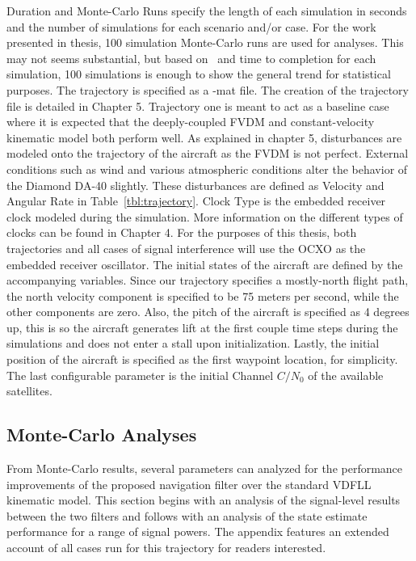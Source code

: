 Duration and Monte-Carlo Runs specify the length of each simulation in seconds and the number of simulations for each scenario and/or case. For the work presented in thesis, 100 simulation Monte-Carlo runs are used for analyses. This may not seems substantial, but based on~\cite{khaghaniAssessmentVDMbasedAutonomous2018,khaghaniAutonomousVehicleDynamic2016,mwenegohaModelbasedTightlyCoupled2020} and time to completion for each simulation, 100 simulations is enough to show the general trend for statistical purposes. The trajectory is specified as a -mat file. The creation of the trajectory file is detailed in Chapter 5. Trajectory one is meant to act as a baseline case where it is expected that the deeply-coupled FVDM and constant-velocity kinematic model both perform well.  As explained in chapter 5, disturbances are modeled onto the trajectory of the aircraft as the FVDM is not perfect. External conditions such as wind and various atmospheric conditions alter the behavior of the Diamond DA-40 slightly. These disturbances are defined as Velocity and Angular Rate in Table~\ref{tbl:trajectory}. Clock Type is the embedded receiver clock modeled during the simulation. More information on the different types of clocks can be found in Chapter 4. For the purposes of this thesis, both trajectories and all cases of signal interference will use the OCXO as the embedded receiver oscillator. The initial states of the aircraft are defined by the accompanying variables. Since our trajectory specifies a mostly-north flight path, the north velocity component is specified to be 75 meters per second, while the other components are zero. Also, the pitch of the aircraft is specified as 4 degrees up, this is so the aircraft generates lift at the first couple time steps during the simulations and does not enter a stall upon initialization. Lastly, the initial position of the aircraft is specified as the first waypoint location, for simplicity. The last configurable parameter is the initial Channel \(C/N_0\) of the available satellites.


\subsection{\textbf{Monte-Carlo Analyses}}
From Monte-Carlo results, several parameters can analyzed for the performance improvements of the proposed navigation filter over the standard VDFLL kinematic model. This section begins with an analysis of the signal-level results between the two filters and follows with an analysis of the state estimate performance for a range of signal powers. The appendix features an extended account of all cases run for this trajectory for readers interested.

